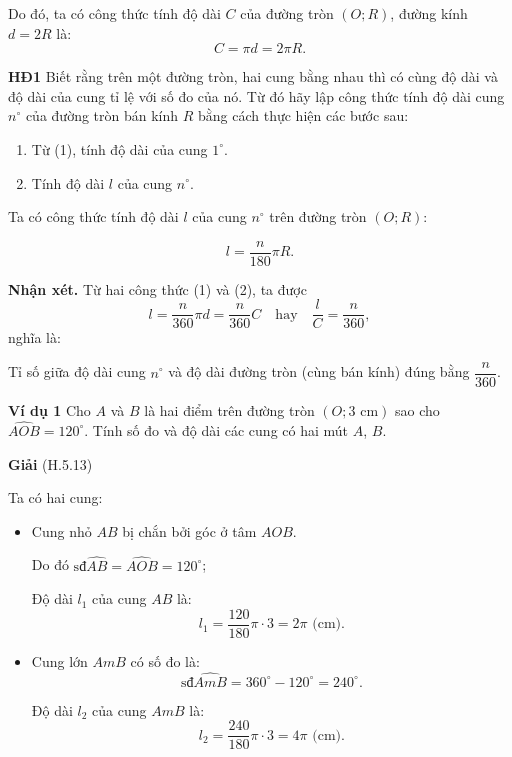 \begin{lesson}
    Do đó, ta có công thức tính độ dài $C$ của đường tròn $(O;R)$, đường kính $d=2R$ là:
    \[
        C=\pi d=2\pi R. \tag{1}
    \]

    \textbf{HĐ1} Biết rằng trên một đường tròn, hai cung bằng nhau thì có cùng độ dài và độ dài của cung tỉ lệ với số đo của nó. Từ đó hãy lập công thức tính độ dài cung $n^\circ$ của đường tròn bán kính $R$ bằng cách thực hiện các bước sau:
    \begin{enumerate}[label=\alph*)]
        \item Từ (1), tính độ dài của cung $1^\circ$.

        \answerline
        \item Tính độ dài $l$ của cung $n^\circ$.

        \answerline
    \end{enumerate}

    Ta có công thức tính độ dài $l$ của cung $n^\circ$ trên đường tròn $(O;R)$:
    \begin{keyconcept}
        \[
            l=\dfrac{n}{180}\pi R. \tag{2}
        \]
    \end{keyconcept}

    \textbf{Nhận xét.} Từ hai công thức (1) và (2), ta được
    \[
        l=\dfrac{n}{360}\pi d=\dfrac{n}{360}C
        \quad\text{hay}\quad
        \dfrac{l}{C}=\dfrac{n}{360},
    \]
    nghĩa là:

    Tỉ số giữa độ dài cung $n^\circ$ và độ dài đường tròn (cùng bán kính) đúng bằng $\dfrac{n}{360}$.

    \textbf{Ví dụ 1} Cho $A$ và $B$ là hai điểm trên đường tròn $(O;3\text{ cm})$ sao cho $\widehat{AOB}=120^\circ$. Tính số đo và độ dài các cung có hai mút $A$, $B$.

    \textbf{Giải} (H.5.13)

    Ta có hai cung:
    \begin{itemize}
        \item Cung nhỏ $AB$ bị chắn bởi góc ở tâm $AOB$.

        Do đó $\text{sđ}\widehat{AB}=\widehat{AOB}=120^\circ$;

        Độ dài $l_1$ của cung $AB$ là:
        \[
            l_1=\dfrac{120}{180}\pi\cdot3=2\pi\text{ (cm)}.
        \]

        \item Cung lớn $AmB$ có số đo là:
        \[
            \text{sđ}\widehat{AmB}=360^\circ-120^\circ=240^\circ.
        \]

        Độ dài $l_2$ của cung $AmB$ là:
        \[
            l_2=\dfrac{240}{180}\pi\cdot3=4\pi\text{ (cm)}.
        \]
    \end{itemize}


\end{lesson}
